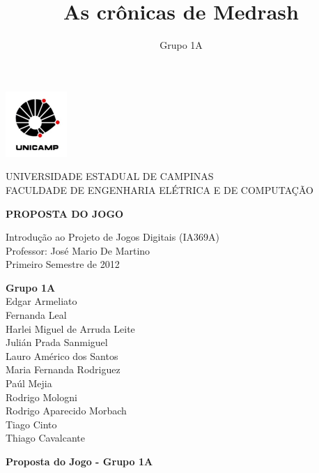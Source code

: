 \documentclass[letterpaper,11pt]{article}
\title{ As cr\^{o}nicas de Medrash }
\author{ Grupo 1A }
\date{}
\begin{document}
\begin{center}
\begin{minipage}{2.4 cm}
\begin{center}
\includegraphics{logo.png}
\end{center}
\end{minipage}
\begin{minipage}{12 cm}
\begin{center}
\Large
UNIVERSIDADE ESTADUAL DE CAMPINAS \\
FACULDADE DE ENGENHARIA ELÉTRICA E DE COMPUTAÇÃO
\end{center}
\end{minipage}
\end{center}

\vspace{6 cm}
\begin{center}
{\bf \large PROPOSTA DO JOGO}
\vspace{0.5 cm}

Introdução ao Projeto de Jogos Digitais (IA369A) \\
Professor: José Mario De Martino \\
Primeiro Semestre de 2012
\end{center}
\vspace{3 cm}
\begin{flushright}
{\bf Grupo 1A} \\
Edgar Armeliato \\
Fernanda Leal \\
Harlei Miguel de Arruda Leite \\
Julián Prada Sanmiguel \\
Lauro Américo dos Santos \\
Maria Fernanda Rodriguez \\
Paúl Mejia \\
Rodrigo Mologni \\
Rodrigo Aparecido Morbach \\
Tiago Cinto \\
Thiago Cavalcante
\end{flushright}

\newpage
\tableofcontents
\newpage

{\bf Proposta do Jogo - Grupo 1A}
\end{document}

